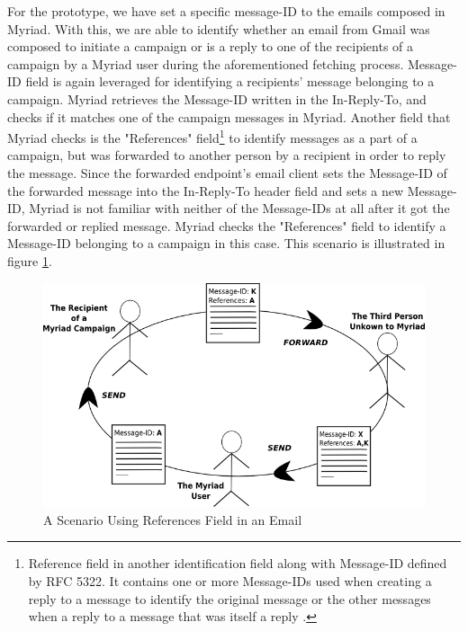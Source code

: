 For the prototype, we have set a specific message-ID to the emails composed in Myriad. With this, we are able to identify whether an email from Gmail was composed to initiate a campaign or is a reply to one of the recipients of a campaign by a Myriad user during the aforementioned fetching process. Message-ID field is again leveraged for identifying a recipients' message belonging to a campaign. Myriad retrieves the Message-ID written in the In-Reply-To, and checks if it matches one of the campaign messages in Myriad. Another field that Myriad checks is the "References" field\footnote{Reference field in another identification field along with Message-ID defined by RFC 5322. It contains one or more Message-IDs used when creating a reply to a message to identify the original message or the other messages when a reply to a message that was itself a reply \citep{rfc5322}.} to identify messages as a part of a campaign, but was forwarded to another person by a recipient in order to reply the message. Since the forwarded endpoint's email client sets the Message-ID of the forwarded message into the In-Reply-To header field and sets a new Message-ID, Myriad is not familiar with neither of the Message-IDs at all after it got the forwarded or replied message. Myriad checks the "References" field to identify a Message-ID belonging to a campaign in this case. This scenario is illustrated in figure \ref{fig:drawingMessageReferences}.

\begin{figure}[htbp]
	\centering
	\includegraphics[width=1.00\textwidth]{imgs/drawingMessageReferences.png}
	\caption[A Scenario Using References Field in an Email]{A Scenario Using References Field in an Email}
	\label{fig:drawingMessageReferences}
\end{figure}

